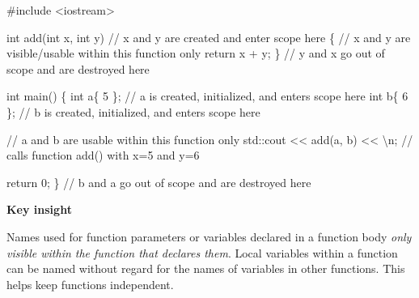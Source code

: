 \documentclass[
  letterpaper,
  DIV=11,
  numbers=noendperiod]{scrreprt}
\newenvironment{Shaded}{\begin{snugshade}}{\end{snugshade}}
\newcommand{\CommentTok}[1]{\textcolor[rgb]{0.37,0.37,0.37}{#1}}
\newcommand{\ControlFlowTok}[1]{\textcolor[rgb]{0.00,0.23,0.31}{#1}}
\newcommand{\DecValTok}[1]{\textcolor[rgb]{0.68,0.00,0.00}{#1}}
\newcommand{\ErrorTok}[1]{\textcolor[rgb]{0.68,0.00,0.00}{#1}}
\newcommand{\FunctionTok}[1]{\textcolor[rgb]{0.28,0.35,0.67}{#1}}
\newcommand{\NormalTok}[1]{\textcolor[rgb]{0.00,0.23,0.31}{#1}}
\newcommand{\OtherTok}[1]{\textcolor[rgb]{0.00,0.23,0.31}{#1}}
\newcommand{\SpecialCharTok}[1]{\textcolor[rgb]{0.37,0.37,0.37}{#1}}
\newcommand{\StringTok}[1]{\textcolor[rgb]{0.13,0.47,0.30}{#1}}
\begin{document}
\begin{Shaded}
\begin{Highlighting}[]
\CommentTok{\#include \textless{}iostream\textgreater{}}

\NormalTok{int }\FunctionTok{add}\NormalTok{(int x, int y) }\SpecialCharTok{/}\ErrorTok{/}\NormalTok{ x and y are created and enter scope here}
\NormalTok{\{}
    \SpecialCharTok{/}\ErrorTok{/}\NormalTok{ x and y are visible}\SpecialCharTok{/}\NormalTok{usable within this }\ControlFlowTok{function}\NormalTok{ only}
\NormalTok{    return x }\SpecialCharTok{+}\NormalTok{ y;}
\NormalTok{\} }\SpecialCharTok{/}\ErrorTok{/}\NormalTok{ y and x go out of scope and are destroyed here}

\NormalTok{int }\FunctionTok{main}\NormalTok{()}
\NormalTok{\{}
\NormalTok{    int a\{ }\DecValTok{5}\NormalTok{ \}; }\SpecialCharTok{/}\ErrorTok{/}\NormalTok{ a is created, initialized, and enters scope here}
\NormalTok{    int b\{ }\DecValTok{6}\NormalTok{ \}; }\SpecialCharTok{/}\ErrorTok{/}\NormalTok{ b is created, initialized, and enters scope here}

    \SpecialCharTok{/}\ErrorTok{/}\NormalTok{ a and b are usable within this }\ControlFlowTok{function}\NormalTok{ only}
\NormalTok{    std}\SpecialCharTok{::}\NormalTok{cout }\SpecialCharTok{\textless{}}\ErrorTok{\textless{}} \FunctionTok{add}\NormalTok{(a, b) }\SpecialCharTok{\textless{}}\ErrorTok{\textless{}} \StringTok{\textquotesingle{}}\SpecialCharTok{\textbackslash{}n}\StringTok{\textquotesingle{}}\NormalTok{; }\SpecialCharTok{/}\ErrorTok{/}\NormalTok{ calls }\ControlFlowTok{function} \FunctionTok{add}\NormalTok{() with x}\OtherTok{=}\DecValTok{5}\NormalTok{ and y}\OtherTok{=}\DecValTok{6}

\NormalTok{    return }\DecValTok{0}\NormalTok{;}
\NormalTok{\} }\SpecialCharTok{/}\ErrorTok{/}\NormalTok{ b and a go out of scope and are destroyed here}
\end{Highlighting}
\end{Shaded}

\begin{tcolorbox}[enhanced jigsaw, toprule=.15mm, rightrule=.15mm, opacityback=0, breakable, leftrule=.75mm, colback=white, colframe=quarto-callout-tip-color-frame, arc=.35mm, left=2mm, bottomrule=.15mm]
\begin{minipage}[t]{5.5mm}
\textcolor{quarto-callout-tip-color}{\faLightbulb}
\end{minipage}%
\begin{minipage}[t]{\textwidth - 5.5mm}

\textbf{Key insight}\vspace{2mm}

Names used for function parameters or variables declared in a function
body \emph{only visible within the function that declares them}. Local
variables within a function can be named without regard for the names of
variables in other functions. This helps keep functions independent.

\end{minipage}%
\end{tcolorbox}
\end{document}
